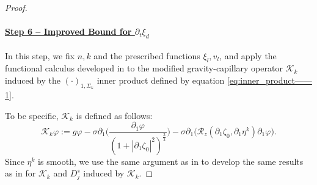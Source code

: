 \documentclass[letterpaper,reqno,10pt,twoside]{amsart}
\theoremstyle{definition}
\theoremstyle{remark}
\def\p{\partial}
\begin{document}
\begin{proof}
		\paragraph{\underline{Step 6 -- Improved Bound for $\p_t\xi_{d}$}}
		
		In this step, we fix $n,k$ and the prescribed functions $\xi_{l},v_{l}$, and apply the functional calculus developed in \cite[Section 8]{GT2020} to the modified gravity-capillary operator $\mathcal{K}_{k}$ induced by the $(\cdot)_{1,\Sigma_{k}}$ inner product defined by equation \eqref{eq:inner_product——1}.
		
		To be specific, $\mathcal{K}_{k}$ is defined as follows:
		\[
		\mathcal{K}_{k}\varphi:=g\varphi-\sigma \p_{1}\Big(\frac{\p_{1}\varphi}{(1+|\p_{1}\zeta_{0}|^{2})^{\frac{3}{2}}}\Big)-\sigma\p_{1}\big(\mathcal{R}_{z}(\p_{1}\zeta_{0},\p_{1}\eta^{k})\p_{1}\varphi\big).
		\]
		Since $\eta^{k}$ is smooth, we use the same argument as in \cite{GT2020} to develop the same results as in \cite{GT2020} for $\mathcal{K}_{k}$ and $D_{j}^{s}$ induced by $\mathcal{K}_{k}$.
		

\end{proof}
\end{document}
